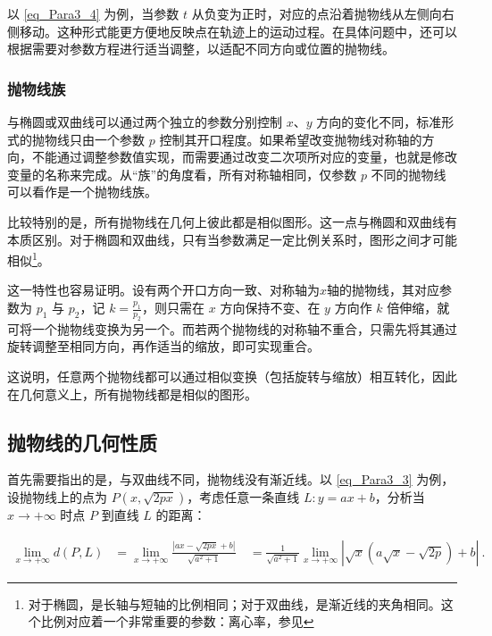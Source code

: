 以 \autoref{eq_Para3_4} 为例，当参数 $t$ 从负变为正时，对应的点沿着抛物线从左侧向右侧移动。这种形式能更方便地反映点在轨迹上的运动过程。在具体问题中，还可以根据需要对参数方程进行适当调整，以适配不同方向或位置的抛物线。

\subsubsection{抛物线族}

与椭圆或双曲线可以通过两个独立的参数分别控制 $x$、$y$ 方向的变化不同，标准形式的抛物线只由一个参数 $p$ 控制其开口程度。如果希望改变抛物线对称轴的方向，不能通过调整参数值实现，而需要通过改变二次项所对应的变量，也就是修改变量的名称来完成。从“族”的角度看，所有对称轴相同，仅参数 $p$ 不同的抛物线可以看作是一个抛物线族。

比较特别的是，所有抛物线在几何上彼此都是相似图形。这一点与椭圆和双曲线有本质区别。对于椭圆和双曲线，只有当参数满足一定比例关系时，图形之间才可能相似\footnote{对于椭圆，是长轴与短轴的比例相同；对于双曲线，是渐近线的夹角相同。这个比例对应着一个非常重要的参数：离心率，参见}。

这一特性也容易证明。设有两个开口方向一致、对称轴为$x$轴的抛物线，其对应参数为 $p_1$ 与 $p_2$，记 $\displaystyle k = \frac{p_1}{p_2}$，则只需在 $x$ 方向保持不变、在 $y$ 方向作 $k$ 倍伸缩，就可将一个抛物线变换为另一个。而若两个抛物线的对称轴不重合，只需先将其通过旋转调整至相同方向，再作适当的缩放，即可实现重合。

这说明，任意两个抛物线都可以通过相似变换（包括旋转与缩放）相互转化，因此在几何意义上，所有抛物线都是相似的图形。

\subsection{抛物线的几何性质}

首先需要指出的是，与双曲线不同，抛物线没有渐近线。以 \autoref{eq_Para3_3} 为例，设抛物线上的点为 $P(x, \sqrt{2px})$，考虑任意一条直线 $L: y = ax + b$，分析当 $x \to +\infty$ 时点 $P$ 到直线 $L$ 的距离：

\begin{equation}
\begin{split}
\lim_{x \to +\infty} d(P, L)
&= \lim_{x \to +\infty} \frac{|ax - \sqrt{2px} + b|}{\sqrt{a^2 + 1}}\
&= \frac{1}{\sqrt{a^2 + 1}} \lim_{x \to +\infty} | \sqrt{x} \left( a\sqrt{x} - \sqrt{2p} \right) + b |~.
\end{split}
\end{equation}

